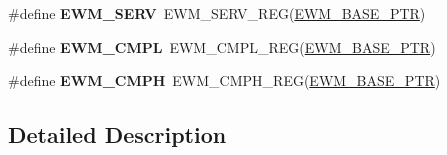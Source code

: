 \begin{DoxyCompactItemize}
\item 
\hypertarget{group___e_w_m___register___accessor___macros_gad5ba7e470596823de41e4970dd7b8dee}{}\#define {\bfseries E\+W\+M\+\_\+\+S\+E\+R\+V}~E\+W\+M\+\_\+\+S\+E\+R\+V\+\_\+\+R\+E\+G(\hyperlink{group___e_w_m___peripheral_gae3454b5b37183b746362498d1fafc40c}{E\+W\+M\+\_\+\+B\+A\+S\+E\+\_\+\+P\+T\+R})\label{group___e_w_m___register___accessor___macros_gad5ba7e470596823de41e4970dd7b8dee}

\item 
\hypertarget{group___e_w_m___register___accessor___macros_ga80939a724dbc1614712bd9a4e148e95e}{}\#define {\bfseries E\+W\+M\+\_\+\+C\+M\+P\+L}~E\+W\+M\+\_\+\+C\+M\+P\+L\+\_\+\+R\+E\+G(\hyperlink{group___e_w_m___peripheral_gae3454b5b37183b746362498d1fafc40c}{E\+W\+M\+\_\+\+B\+A\+S\+E\+\_\+\+P\+T\+R})\label{group___e_w_m___register___accessor___macros_ga80939a724dbc1614712bd9a4e148e95e}

\item 
\hypertarget{group___e_w_m___register___accessor___macros_gaca7d16fcda675937b2e9df523618b7f9}{}\#define {\bfseries E\+W\+M\+\_\+\+C\+M\+P\+H}~E\+W\+M\+\_\+\+C\+M\+P\+H\+\_\+\+R\+E\+G(\hyperlink{group___e_w_m___peripheral_gae3454b5b37183b746362498d1fafc40c}{E\+W\+M\+\_\+\+B\+A\+S\+E\+\_\+\+P\+T\+R})\label{group___e_w_m___register___accessor___macros_gaca7d16fcda675937b2e9df523618b7f9}

\end{DoxyCompactItemize}


\subsection{Detailed Description}
